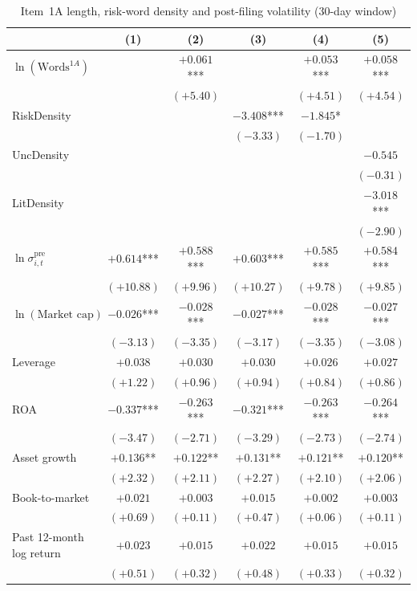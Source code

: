 \begin{table}[htbp]
\centering
\caption{Item~1A length, risk-word density and post-filing volatility (30-day window)}
\label{tab:main_30d}
\small
\begin{tabular}{lccccc}
\toprule
 & (1) & (2) & (3) & (4) & (5) \\
\midrule
$\ln(\text{Words}^{1A})$ &  & $+0.061$*** &  & $+0.053$*** & $+0.058$*** \\
 &  & $(+5.40)$ &  & $(+4.51)$ & $(+4.54)$ \\[2pt]
RiskDensity &  &  & $-3.408$*** & $-1.845$* &  \\
 &  &  & $(-3.33)$ & $(-1.70)$ &  \\[2pt]
UncDensity &  &  &  &  & $-0.545$ \\
 &  &  &  &  & $(-0.31)$ \\[2pt]
LitDensity &  &  &  &  & $-3.018$*** \\
 &  &  &  &  & $(-2.90)$ \\[2pt]
$\ln\sigma^{\mathrm{pre}}_{i,t}$ & $+0.614$*** & $+0.588$*** & $+0.603$*** & $+0.585$*** & $+0.584$*** \\
 & $(+10.88)$ & $(+9.96)$ & $(+10.27)$ & $(+9.78)$ & $(+9.85)$ \\[2pt]
$\ln(\text{Market cap})$ & $-0.026$*** & $-0.028$*** & $-0.027$*** & $-0.028$*** & $-0.027$*** \\
 & $(-3.13)$ & $(-3.35)$ & $(-3.17)$ & $(-3.35)$ & $(-3.08)$ \\[2pt]
Leverage & $+0.038$ & $+0.030$ & $+0.030$ & $+0.026$ & $+0.027$ \\
 & $(+1.22)$ & $(+0.96)$ & $(+0.94)$ & $(+0.84)$ & $(+0.86)$ \\[2pt]
ROA & $-0.337$*** & $-0.263$*** & $-0.321$*** & $-0.263$*** & $-0.264$*** \\
 & $(-3.47)$ & $(-2.71)$ & $(-3.29)$ & $(-2.73)$ & $(-2.74)$ \\[2pt]
Asset growth & $+0.136$** & $+0.122$** & $+0.131$** & $+0.121$** & $+0.120$** \\
 & $(+2.32)$ & $(+2.11)$ & $(+2.27)$ & $(+2.10)$ & $(+2.06)$ \\[2pt]
Book-to-market & $+0.021$ & $+0.003$ & $+0.015$ & $+0.002$ & $+0.003$ \\
 & $(+0.69)$ & $(+0.11)$ & $(+0.47)$ & $(+0.06)$ & $(+0.11)$ \\[2pt]
Past 12-month log return & $+0.023$ & $+0.015$ & $+0.022$ & $+0.015$ & $+0.015$ \\
 & $(+0.51)$ & $(+0.32)$ & $(+0.48)$ & $(+0.33)$ & $(+0.32)$ \\[2pt]

\end{tabular}
\end{table}
